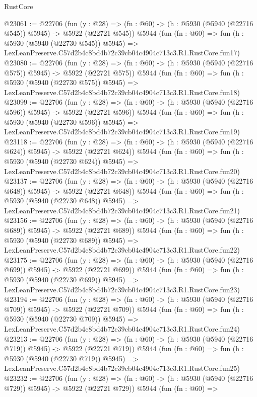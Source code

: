 \begin{lexlean}{RustCore}
\begin{coremodule}
@23061 := @22706
    (fun (y : @28) => (fn : @60) -> (h : @5930 (@5940 (@22716 @545)) @5945) -> @5922 (@22721 @545))
    @5944
    (fun (fn : @60) =>
    fun (h : @5930 (@5940 (@22730 @545)) @5945) =>
    LexLeanPreserve.C57d2b4c8bd4b72c39cb04c4904c713c3.R1.RustCore.fun17)
@23080 := @22706
    (fun (y : @28) => (fn : @60) -> (h : @5930 (@5940 (@22716 @575)) @5945) -> @5922 (@22721 @575))
    @5944
    (fun (fn : @60) =>
    fun (h : @5930 (@5940 (@22730 @575)) @5945) =>
    LexLeanPreserve.C57d2b4c8bd4b72c39cb04c4904c713c3.R1.RustCore.fun18)
@23099 := @22706
    (fun (y : @28) => (fn : @60) -> (h : @5930 (@5940 (@22716 @596)) @5945) -> @5922 (@22721 @596))
    @5944
    (fun (fn : @60) =>
    fun (h : @5930 (@5940 (@22730 @596)) @5945) =>
    LexLeanPreserve.C57d2b4c8bd4b72c39cb04c4904c713c3.R1.RustCore.fun19)
@23118 := @22706
    (fun (y : @28) => (fn : @60) -> (h : @5930 (@5940 (@22716 @624)) @5945) -> @5922 (@22721 @624))
    @5944
    (fun (fn : @60) =>
    fun (h : @5930 (@5940 (@22730 @624)) @5945) =>
    LexLeanPreserve.C57d2b4c8bd4b72c39cb04c4904c713c3.R1.RustCore.fun20)
@23137 := @22706
    (fun (y : @28) => (fn : @60) -> (h : @5930 (@5940 (@22716 @648)) @5945) -> @5922 (@22721 @648))
    @5944
    (fun (fn : @60) =>
    fun (h : @5930 (@5940 (@22730 @648)) @5945) =>
    LexLeanPreserve.C57d2b4c8bd4b72c39cb04c4904c713c3.R1.RustCore.fun21)
@23156 := @22706
    (fun (y : @28) => (fn : @60) -> (h : @5930 (@5940 (@22716 @689)) @5945) -> @5922 (@22721 @689))
    @5944
    (fun (fn : @60) =>
    fun (h : @5930 (@5940 (@22730 @689)) @5945) =>
    LexLeanPreserve.C57d2b4c8bd4b72c39cb04c4904c713c3.R1.RustCore.fun22)
@23175 := @22706
    (fun (y : @28) => (fn : @60) -> (h : @5930 (@5940 (@22716 @699)) @5945) -> @5922 (@22721 @699))
    @5944
    (fun (fn : @60) =>
    fun (h : @5930 (@5940 (@22730 @699)) @5945) =>
    LexLeanPreserve.C57d2b4c8bd4b72c39cb04c4904c713c3.R1.RustCore.fun23)
@23194 := @22706
    (fun (y : @28) => (fn : @60) -> (h : @5930 (@5940 (@22716 @709)) @5945) -> @5922 (@22721 @709))
    @5944
    (fun (fn : @60) =>
    fun (h : @5930 (@5940 (@22730 @709)) @5945) =>
    LexLeanPreserve.C57d2b4c8bd4b72c39cb04c4904c713c3.R1.RustCore.fun24)
@23213 := @22706
    (fun (y : @28) => (fn : @60) -> (h : @5930 (@5940 (@22716 @719)) @5945) -> @5922 (@22721 @719))
    @5944
    (fun (fn : @60) =>
    fun (h : @5930 (@5940 (@22730 @719)) @5945) =>
    LexLeanPreserve.C57d2b4c8bd4b72c39cb04c4904c713c3.R1.RustCore.fun25)
@23232 := @22706
    (fun (y : @28) => (fn : @60) -> (h : @5930 (@5940 (@22716 @729)) @5945) -> @5922 (@22721 @729))
    @5944
    (fun (fn : @60) =>

\end{coremodule}
\end{lexlean}

